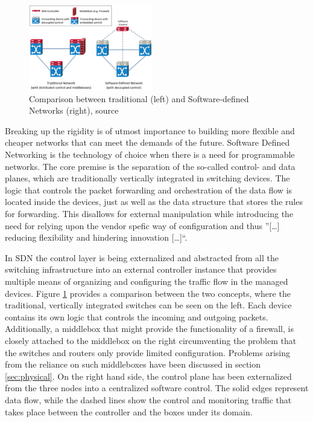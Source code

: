 \begin{figure}[h]
	\centering
	\includegraphics[width=0.48\textwidth]{images/sdn.png}
	\caption{Comparison between traditional (left) and Software-defined Networks (right), source \cite{li2015software}}
	\label{img:sdn}
\end{figure}
Breaking up the rigidity is of utmost importance to building more flexible and cheaper networks that can  meet the demands of the future. Software Defined Networking is the technology of choice when there is a need for programmable networks. The core premise is the separation of the so-called control- and data planes, which are traditionally vertically integrated in switching devices. The logic that controls the packet forwarding and orchestration of the data flow is located inside the devices, just as well as the data structure that stores the rules for forwarding. This disallows for external manipulation while introducing the need for relying upon the vendor spefic way of configuration and thus ''[\dots]  reducing flexibility and hindering innovation [\dots]``\cite{kreutz2015software}.

In SDN the control layer is being externalized and abstracted from all the switching infrastructure into an external controller instance that provides multiple means of organizing and configuring the traffic flow in the managed devices. Figure \ref{img:sdn} provides a comparison between the two concepts, where the traditional, vertically integrated switches can be seen on the left. Each device contains its own logic that controls the incoming and outgoing packets. Additionally, a middlebox that might provide the functionality of a firewall, is closely attached to the middlebox on the right circumventing the problem that the switches and routers only provide limited configuration. Problems arising from the reliance on such middleboxes have been discussed in section \ref{sec:physical}.  On the right hand side, the control plane has been externalized from the three nodes into a centralized software control. The solid edges represent data flow, while the dashed lines show the control and monitoring traffic that takes place between the controller and the boxes under its domain.

